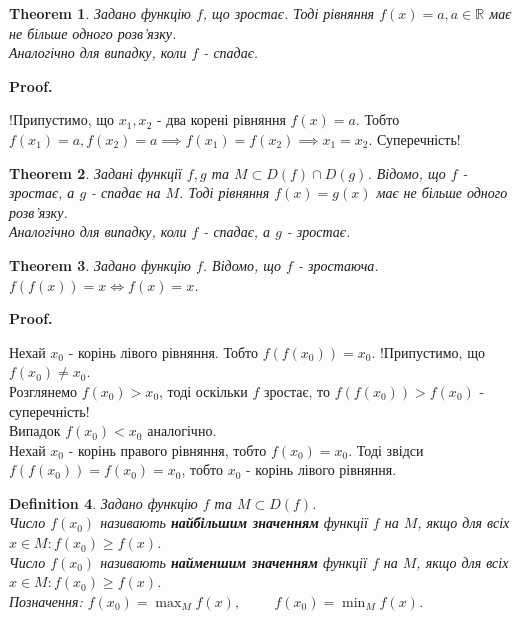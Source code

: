 \documentclass[a4paper, 10pt]{article}
\makeatletter
\def\huge{\displaystyle}
\def\qed{$\blacksquare$}
\theoremstyle{theoremdd}
\newtheorem{theorem}{Theorem}[subsection]
\theoremstyle{theoremdd}
\newtheorem{definition}[theorem]{Definition}
\theoremstyle{theoremdd}
\theoremstyle{theoremdd}
\theoremstyle{theoremdd}
\theoremstyle{theoremdd}
\theoremstyle{theoremdd}
\theoremstyle{theoremdd}
\renewenvironment{proof}[1][Proof.\\]{\par
\pushQED{\hfill \qed}%
\normalfont \topsep6\p@\@plus6\p@\relax
\trivlist
\item\relax
{\bfseries
#1\@addpunct{.}}\hspace\labelsep\ignorespaces
}{%
\popQED\endtrivlist\@endpefalse
}
\makeatother
\begin{document}
\begin{theorem}
Задано функцію $f$, що зростає. Тоді рівняння $f(x) = a, a \in \mathbb{R}$ має не більше одного розв'язку.\\
\textit{Аналогічно для випадку, коли $f$ - спадає.}
\end{theorem}

\begin{proof}
!Припустимо, що $x_1,x_2$ - два корені рівняння $f(x) = a$. Тобто $f(x_1) = a, f(x_2) = a \implies f(x_1) = f(x_2) \implies x_1 = x_2$. Суперечність!
\end{proof}

\begin{theorem}
Задані функції $f,g$ та $M \subset D(f) \cap D(g)$. Відомо, що $f$ - зростає, а $g$ - спадає на $M$. Тоді рівняння $f(x) = g(x)$ має не більше одного розв'язку.\\
\textit{Аналогічно для випадку, коли $f$ - спадає, а $g$ - зростає.}
\end{theorem}

\begin{theorem}
Задано функцію $f$. Відомо, що $f$ - зростаюча.\\
$f(f(x)) = x \iff f(x) = x$.
\end{theorem}

\begin{proof}
Нехай $x_0$ - корінь лівого рівняння. Тобто $f(f(x_0)) = x_0$. !Припустимо, що $f(x_0) \neq x_0$.\\
Розглянемо $f(x_0) > x_0$, тоді оскільки $f$ зростає, то $f(f(x_0)) > f(x_0)$ - суперечність! \\
Випадок $f(x_0) < x_0$ аналогічно.
\bigskip \\
Нехай $x_0$ - корінь правого рівняння, тобто $f(x_0) = x_0$. Тоді звідси $f(f(x_0)) = f(x_0) = x_0$, тобто $x_0$ - корінь лівого рівняння.
\end{proof}

\begin{definition}
Задано функцію $f$ та $M \subset D(f)$.\\
Число $f(x_0)$ називають \textbf{найбільшим значенням} функції $f$ на $M$, якщо для всіх $x \in M: f(x_0) \geq f(x)$.\\
Число $f(x_0)$ називають \textbf{найменшим значенням} функції $f$ на $M$, якщо для всіх $x \in M: f(x_0) \geq f(x)$.\\
Позначення: $f(x_0) = \huge\max_M f(x), \hspace{1cm} f(x_0) = \min_M f(x)$.
\end{definition}
\end{document}
